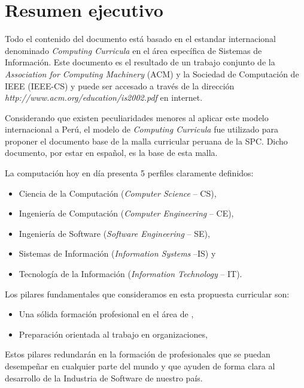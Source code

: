 \chapter*{Resumen ejecutivo}
\AbstractIntro

Todo el contenido del documento está basado en el estandar internacional denominado
\textit{Computing Curricula} en el área especí­fica de Sistemas de Información.
Este documento es el resultado de un trabajo conjunto de la 
\textit{Association for Computing Machinery} (ACM) y la 
Sociedad de Computación de IEEE (IEEE-CS) y puede ser accesado a través de la 
dirección \textit{http://www.acm.org/education/is2002.pdf} en internet.

Considerando que existen peculiaridades menores al aplicar este modelo internacional a Perú,
el modelo de \textit{Computing Curricula} fue utilizado para proponer el documento base de 
la malla curricular peruana de la \acl{SPC}. Dicho documento, por estar en español, 
es la base de esta malla.

La computación hoy en dí­a presenta 5 perfiles claramente definidos: 
\begin{itemize}
\item Ciencia de la Computación (\textit{Computer Science} -- CS),
\item Ingenierí­a de Computación (\textit{Computer Engineering} -- CE),
\item Ingenierí­a de Software (\textit{Software Engineering} -- SE),
\item Sistemas de Información (\textit{Information Systems} --IS) y 
\item Tecnologí­a de la Información (\textit{Information Technology} -- IT).
\end{itemize}

Los pilares fundamentales que consideramos en esta propuesta curricular son:
\begin{itemize}
\item Una sólida formación profesional en el área de \SchoolShortName,
\item Preparación orientada al trabajo en organizaciones,
\end{itemize}

Estos pilares redundarán en la formación de profesionales que se puedan 
desempeñar en cualquier parte del mundo y que ayuden de forma clara al 
desarrollo de la Industria de Software de nuestro paí­s.


